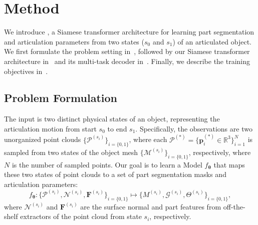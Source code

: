 


\section{Method}%
\label{sec:method}

We introduce \method,
a Siamese transformer architecture for learning part segmentation and articulation parameters from two states ($s_0$ and $s_1$) of an articulated object.
We first formulate the problem setting in~,
followed by our Siamese transformer architecture in~ and its multi-task decoder in~.
Finally, we describe the training objectives in~.


\subsection{Problem Formulation}
\label{sec:problem}
The input is two distinct physical states of an object,
representing the articulation motion from start $s_0$ to end $s_1$.
Specifically, the observations are two unorganized point clouds 
$\{\mathcal{P}^{(s_i)}\}_{i=\{0,1\}}$,
where each
$\mathcal{P}^{(*)} = \{\bm{p}_i^{(*)}\in\mathbb{R}^3\}_{i=1}^N$
is sampled from two states of the object mesh
$\{\mathcal{M}^{(s_i)}\}_{i=\{0,1\}}$,
respectively,
where $N$ is the number of sampled points.
Our goal is to learn a Model
$f_{\bm{\theta}}$
that maps these two states of point clouds to a set of part segmentation masks and articulation parameters:
\begin{equation}
    \label{eq:goal}
    f_{\bm{\theta}} : \{\mathcal{P}^{(s_i)}, \mathcal{N}^{(s_i)}, \bm{F}^{(s_i)}\}_{i=\{0,1\}} \mapsto \{M^{(s_i)}, \mathcal{G}^{(s_i)}, \Theta^{(s_i)}\}_{i=\{0,1\}},
\end{equation}
where $\mathcal{N}^{(s_i)}$ and $\bm{F}^{(s_i)}$ are the surface normal and part features from off-the-shelf extractors of the point cloud from state $s_i$, respectively.

